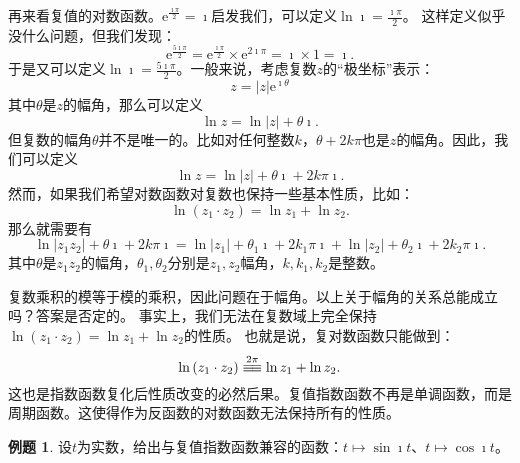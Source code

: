 \documentclass[12pt,UTF8]{ctexbook}
\newcommand{\e}{\mathrm{e}}
\newcommand{\tong}[1]{\overset{#1}{\equiv\joinrel\equiv}}  %
\theoremstyle{definition}
\newtheorem{et}{例题}[section]
\theoremstyle{plain}
\begin{document}
再来看复值的对数函数。$\e^{\frac{\imath\pi}{2}} = \imath$启发我们，可以定义$\ln{\imath} = \frac{\imath\pi}{2}$。
这样定义似乎没什么问题，但我们发现：
$$ \e^{\frac{5\imath\pi}{2}} = \e^{\frac{\imath\pi}{2}} \times \e^{2\imath\pi} = \imath \times 1 = \imath. $$
于是又可以定义$\ln{\imath} = \frac{5\imath\pi}{2}$。一般来说，考虑复数$z$的“极坐标”表示：
$$ z = |z| \e^{\imath \theta}$$
其中$\theta$是$z$的幅角，那么可以定义
$$\ln{z} = \ln{|z|} + \theta \imath.$$
但复数的幅角$\theta$并不是唯一的。比如对任何整数$k$，$\theta + 2k\pi$也是$z$的幅角。因此，我们可以定义
$$\ln{z} = \ln{|z|} + \theta \imath + 2k\pi\imath.$$
然而，如果我们希望对数函数对复数也保持一些基本性质，比如：
$$ \ln{(z_1 \cdot z_2)} = \ln{z_1} + \ln{z_2}. $$
那么就需要有
$$ \ln{|z_1z_2|} + \theta \imath + 2k\pi\imath = \ln{|z_1|} + \theta_1 \imath + 2k_1\pi\imath + \ln{|z_2|} + \theta_2 \imath + 2k_2\pi\imath.$$
其中$\theta$是$z_1z_2$的幅角，$\theta_1, \theta_2$分别是$z_1, z_2$幅角，$k, k_1, k_2$是整数。

复数乘积的模等于模的乘积，因此问题在于幅角。以上关于幅角的关系总能成立吗？答案是否定的。
事实上，我们无法在复数域上完全保持$\ln{(z_1 \cdot z_2)} = \ln{z_1} + \ln{z_2}$的性质。
也就是说，复对数函数只能做到：
$$ \ln{(z_1 \cdot z_2)} \tong{2\pi} \ln{z_1} + \ln{z_2} . $$
这也是指数函数复化后性质改变的必然后果。复值指数函数不再是单调函数，而是周期函数。这使得作为反函数的对数函数无法保持所有的性质。

\begin{et}
    设$t$为实数，给出与复值指数函数兼容的函数：$t\mapsto \sin{\imath t}$、$t\mapsto \cos{\imath t}$。
\end{et}
\end{document}
